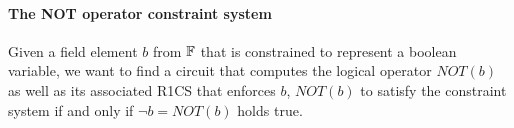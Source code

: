 \begin{exercise}
\begin{comment}
  nOR1 [shape=box, label="b_1"] ;
  nOR2 [shape=box, label="b_2"] ;
  nOR3 [shape=box, label="-1"] ;
  nOR4 [shape=box, label="1"] ;
  nOR5 [label="*"] ;
  nOR6 [label="+"] ;
  nOR7 [label="*"] ;
  nOR8 [label="+"] ;
  nOR9 [label="*"] ;
  nOR10 [label="*"] ;
  nOR11 [label="+"] ;
  nOR12 [shape=box, label="OR(b_1,b_2)"] ;
}
\end{center}
The associated Rank-1 Constraint System can be deduced from the general process \ref{sec:circuits_associated_R1CS} and consists of the following constraints
\begin{align*}
 (1- S_1) \cdot (1-S_2) & = S_3\\
  (1-S_3)\cdot 1 &= S_4
\end{align*}
Common circuit languages typically provide a gadget or a function to abstract over this circuit such that programers can use the $\vee$ operator without caring about the associated circuit. In \lgname{PAPER}, we define the following function that compiles to the $\vee$-operator's circuit:
\begin{lstlisting}
fn OR(b_1 : BOOL, b_2 : BOOL) -> OR(b_1,b_2) : BOOL{
  l
  constant c1 = 1 ;
  constant c2 = -1 ;
  OR(b_1,b_2) <== ADD(c1,MUL(MUL(ADD(c1,MUL(b_1,c2)),ADD(c1,MUL(b_1,c2))),c2))  ;
}
\end{lstlisting}
In the setup phase of a statement, we compile every occurrence of the $\mathtt{OR}$ function into an instance of its associated $\vee$-operator's circuit.
\end{comment} 
\end{exercise}
\paragraph{The NOT operator constraint system} Given a field element $b$ from $\mathbb{F}$ that is constrained to represent a boolean variable, we want to find a circuit that computes the logical  operator $NOT(b)$ as well as its associated R1CS that enforces $b$, $NOT(b)$ to satisfy the constraint system if and only if $\lnot b = NOT(b)$ holds true. 

